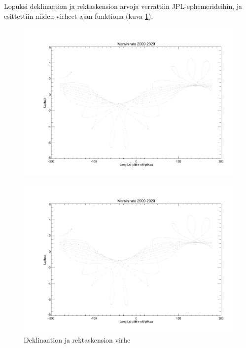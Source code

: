 \documentclass[12pt, a4paper]{article}
\begin{document}
Lopuksi deklinaation ja rektaskension arvoja verrattiin JPL-ephemerideihin, ja esittettiin niiden virheet ajan funktiona (kuva \ref{Kuva4}).

\newpage
\begin{figure}[H]
\vspace*{-3.5cm}\centerline{\includegraphics[page=4,angle=0,width=0.8\paperwidth]{mars.pdf}}
\end{figure}

\begin{figure}[H]
\vspace*{-2.5cm}\centerline{\includegraphics[page=5,angle=0,width=0.8\paperwidth]{mars.pdf}}
\caption{Deklinaation ja rektaskension virhe}
\label{Kuva4}
\end{figure}
\end{document}
